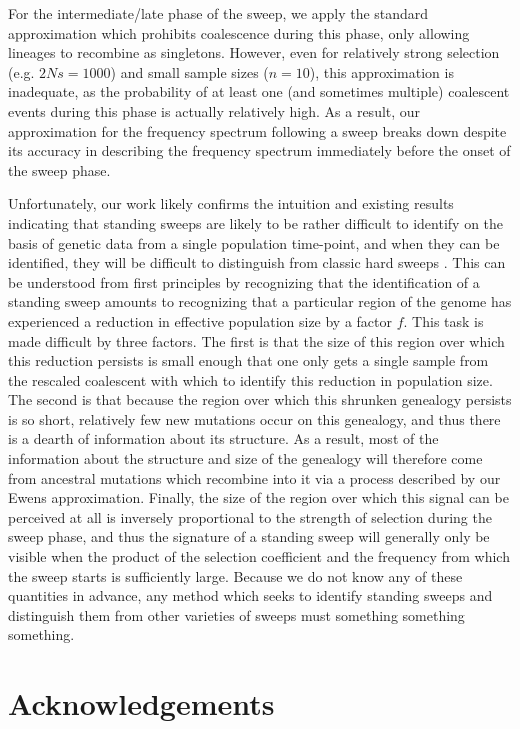 \documentclass[a4paper,10pt]{article}
\begin{document}
For the intermediate/late phase of the sweep, we apply the standard approximation which prohibits coalescence during this phase, only allowing lineages to recombine as singletons. However, even for relatively strong selection (e.g. $2Ns = 1000$) and small sample sizes ($n = 10$), this approximation is inadequate, as the probability of at least one (and sometimes multiple) coalescent events during this phase is actually relatively high. As a result, our approximation for the frequency spectrum following a sweep breaks down despite its accuracy in describing the frequency spectrum immediately before the onset of the sweep phase.

Unfortunately, our work likely confirms the intuition and existing results indicating that standing sweeps are likely to be rather difficult to identify on the basis of genetic data from a single population time-point, and when they can be identified, they will be difficult to distinguish from classic hard sweeps \cite{Peter:2012ht}. This can be understood from first principles by recognizing that the identification of a standing sweep amounts to recognizing that a particular region of the genome has experienced a reduction in effective population size by a factor $f$. This task is made difficult by three factors. The first is that the size of this region over which this reduction persists is small enough that one only gets a single sample from the rescaled coalescent with which to identify this reduction in population size. The second is that because the region over which this shrunken genealogy persists is so short, relatively few new mutations occur on this genealogy, and thus there is a dearth of information about its structure. As a result, most of the information about the structure and size of the genealogy will therefore come from ancestral mutations which recombine into it via a process described by our Ewens approximation. Finally, the size of the region over which this signal can be perceived at all is inversely proportional to the strength of selection during the sweep phase, and thus the signature of a standing sweep will generally only be visible when the product of the selection coefficient and the frequency from which the sweep starts is sufficiently large. Because we do not know any of these quantities in advance, any method which seeks to identify standing sweeps and distinguish them from other varieties of sweeps must something something something.


\section{Acknowledgements}
\end{document}
